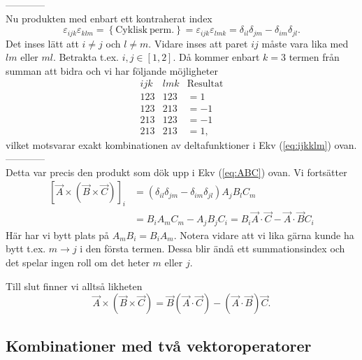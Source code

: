 \documentclass[%
oneside,                 %
final,                   %
10pt]{article}
\begin{document}
------------\\
Nu produkten med enbart ett kontraherat index
\begin{equation}
  \label{eq:ijkklm}
  \varepsilon_{ijk} \varepsilon_{klm} = \left\{ \mathrm{Cyklisk~perm.} \right\} = \varepsilon_{ijk} \varepsilon_{lmk} = \delta_{il} \delta_{jm} - \delta_{im} \delta_{jl}.
\end{equation}
Det inses lätt att $i \neq j$ och $l \neq m$. Vidare inses att paret $ij$ måste vara lika med $lm$ eller $ml$. Betrakta t.ex. $i,j \in [1,2]$. Då kommer enbart $k=3$ termen från summan att bidra och vi har följande möjligheter
\begin{equation}
  \begin{array}{lll}
  	ijk & lmk & \mathrm{Resultat} \\
  	123 & 123 & = 1 \\
  	123 & 213 & = -1 \\
  	213 & 123 & = -1 \\
  	213 & 213 & = 1,
  \end{array}
\end{equation}
vilket motsvarar exakt kombinationen av deltafunktioner i Ekv (\ref{eq:ijkklm}) ovan.\\
------------\\
Detta var precis den produkt som dök upp i Ekv (\ref{eq:ABC}) ovan. Vi fortsätter
\begin{align}
  \left[ \vec{A} \times \left( \vec{B} \times \vec{C} \right) \right]_i 
  &= \left( \delta_{il} \delta_{jm} - \delta_{im} \delta_{jl} \right) A_j B_l C_m \nonumber \\
  &= B_i A_m C_m - A_j B_j C_i = B_i \vec{A}\cdot\vec{C} - \vec{A}\cdot\vec{B} C_i 
\end{align}
Här har vi bytt plats på $A_m B_i = B_i A_m$. Notera vidare att vi lika gärna kunde ha bytt t.ex. $m \to j$ i den första termen. Dessa blir ändå ett summationsindex och det spelar ingen roll om det heter $m$ eller $j$. 

Till slut finner vi alltså likheten
\begin{equation}
  \label{eq:ABCresultat}
  \vec{A} \times \left( \vec{B} \times \vec{C} \right) = \vec{B} (\vec{A}\cdot\vec{C}) - (\vec{A}\cdot\vec{B}) \vec{C}.
\end{equation}

\subsection{Kombinationer med två vektoroperatorer}
\end{document}
